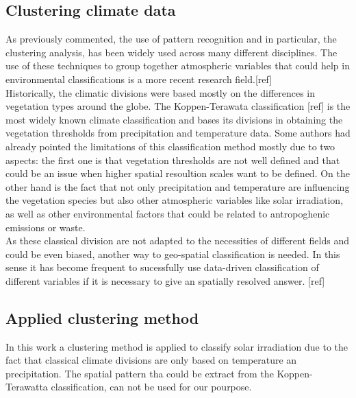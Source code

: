 \subsection{Clustering climate data}

As previously commented, the use of pattern recognition and in particular, the clustering analysis, has been widely used across many different disciplines. The use of these techniques to group together atmospheric variables that could help in environmental classifications is a more recent research field.[ref]\\

Historically, the climatic divisions were based mostly on the differences in vegetation types around the globe. The Koppen-Terawata classification [ref] is the most widely known climate classification and bases its divisions in obtaining the vegetation thresholds from precipitation and temperature data. Some authors had already pointed the limitations of this classification method mostly due to two aspects: the first one is that vegetation thresholds are not well defined and that could be an issue when higher spatial resoultion scales want to be defined. On the other hand is the fact that not only precipitation and temperature are influencing the vegetation species but also other atmospheric variables like solar irradiation, as well as other environmental factors that could be related to antropoghenic emissions or waste.\\


As these classical division are not adapted to the necessities of different fields and could be even biased, another way to geo-spatial classification is needed. In this sense it has become frequent to sucessfully use data-driven classification of different variables if it is necessary to give an spatially resolved answer. [ref]

\subsection{Applied clustering method}

In this work a clustering method is applied to classify solar irradiation due to the fact that classical climate divisions are only based on temperature an precipitation. The spatial pattern tha could be extract from the Koppen-Terawatta classification, can not be used for our pourpose.\\

